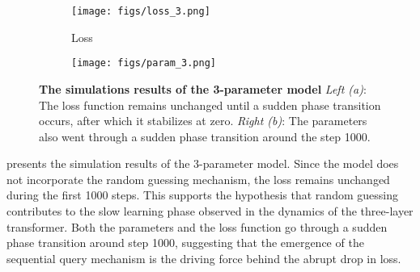 \begin{figure}
    \centering
    \begin{subfigure}[t]{0.23\textwidth}
        \centering 
        \caption{\small Loss}
\texttt{[image: figs/loss\_3.png]}
    \end{subfigure}
    \begin{subfigure}[t]{0.23\textwidth}
    \centering
\texttt{[image: figs/param\_3.png]}
    \end{subfigure}
    \caption{\textbf{The simulations results of the 3-parameter model} \textit{Left (a)}:  The loss function remains unchanged until a sudden phase transition occurs, after which it stabilizes at zero. \textit{Right (b)}: The parameters also went through a sudden phase transition around the step 1000.}
    \label{fig:3_param_dnamics}
\end{figure}

 presents the simulation results of the 3-parameter model. Since the model does not incorporate the random guessing mechanism, the loss remains unchanged during the first 1000 steps. This supports the hypothesis that random guessing contributes to the slow learning phase observed in the dynamics of the three-layer transformer.
Both the parameters and the loss function go through a sudden phase transition around step 1000, suggesting that the emergence of the sequential query mechanism is the driving force behind the abrupt drop in loss.





